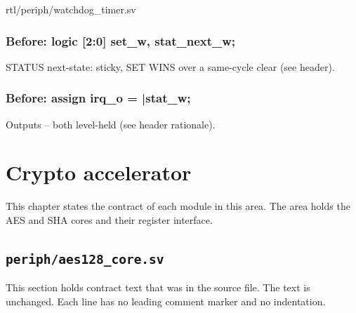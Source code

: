 \begin{relocated}{rtl/periph/watchdog_timer.sv}
\subsection*{Before: logic [2:0] set\_w, stat\_next\_w;}

\begin{textblock}
STATUS next-state: sticky, SET WINS over a same-cycle clear (see header).
\end{textblock}

\subsection*{Before: assign irq\_o         = |stat\_w;}

\begin{textblock}
Outputs -- both level-held (see header rationale).
\end{textblock}

\end{relocated}








\chapter{Crypto accelerator}\label{ds:ch:mod-crypto-accelerator}

This chapter states the contract of each module in this area. The area holds the AES and SHA cores and their register interface.

\section{\texttt{periph/aes128\_core.sv}}\label{ds:mod:aes128-core}

This section holds contract text that was in the source file. The text is unchanged. Each line has no leading comment marker and no indentation.

